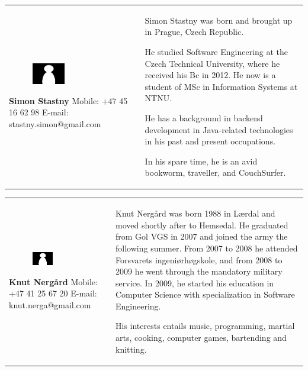 \documentclass[11pt]{book}
\begin{document}
\begin{table}[H]
\centering
\begin{tabular}{ p{7cm} p{7cm} }
\parbox{7cm}{
\begin{figure}[H]
      \includegraphics[width=0.4\textwidth]{Figures/Person.png}
      \label{fig:partners_group_simon}
\end{figure}
\textbf{Simon Stastny}\\
Mobile: +47 45 16 62 98\\
E-mail: stastny.simon@gmail.com} & \parbox{7cm}{
    
Simon Stastny was born and brought up in Prague, Czech Republic.

He studied Software Engineering at the Czech Technical University, where he received his Bc in 2012. He now is a student of MSc in Information Systems at NTNU.

He has a background in backend development in Java-related technologies in his past and present occupations.

In his spare time, he is an avid bookworm, traveller, and CouchSurfer.

}
\end{tabular}
\label{tab:partners_group_simon}
\end{table}

\begin{table}[H]
\centering
\begin{tabular}{ p{7cm} p{7cm} }
\parbox{7cm}{
\begin{figure}[H]
      \includegraphics[width=0.4\textwidth]{Figures/Person.png}
      \label{fig:partners_group_knut}
\end{figure}
\textbf{Knut Nergård}\\
Mobile: +47 41 25 67 20\\
E-mail: knut.nerga@gmail.com} & \parbox{7cm}{
Knut Nergård was born 1988 in Lærdal and moved shortly after to Hemsedal. He graduated from Gol VGS in 2007 and joined the army the following summer. From 2007 to 2008 he attended Forsvarets ingeniørhøgskole, and from 2008 to 2009 he went through the mandatory military service. In 2009, he started his education in Computer Science with specialization in Software Engineering. 

His interests entails music, programming, martial arts, cooking, computer games, bartending and knitting.
}
\end{tabular}
\label{tab:partners_group_knut}
\end{table}
\end{document}
